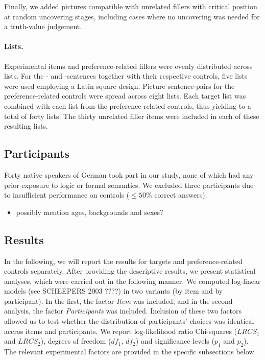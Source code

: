 \documentclass[fleqn,reqno,10pt,draft]{article}
\newcommand{\as}{\acro{as}}
\renewcommand{\es}{\acro{es}}
\begin{document}
Finally, we added pictures compatible with unrelated fillers with
critical position at random uncovering stages, including cases where
no uncovering was needed for a truth-value judgement.

\paragraph{Lists.}
Experimental items and preference-related fillers were evenly
distributed across lists. For the \as- and \es-sentences together with
their respective controls, five lists were used employing a Latin
square design. Picture sentence-pairs for the preference-related
controls were spread across eight lists. Each target list was combined
with each list from the preference-related controls, thus yielding to
a total of forty lists. The thirty unrelated filler items were
included in each of these resulting lists.


\subsection{Participants}
\label{sec:participants} 

Forty native speakers of German took part in our study, none of which had
any prior exposure to logic or formal semantics. We excluded three
participants due to insufficient performance on controls ($\le 50\%$
correct answers).  

\begin{itemize}
\item possibly mention ages, backgrounds and sexes?
\end{itemize}


\subsection{Results}
\label{sec:results}

In the following, we will report the results for targets and
preference-related controls separately. After providing the
descriptive results, we present statistical analyses, which were
carried out in the following manner.  We computed log-linear models
(see SCHEEPERS 2003 ????) in two variants (by item and by participant). In
the first, the factor {\it Item} was included, and in the second
analysis, the factor {\it Participants} was included. Inclusion of
these two factors allowed us to test whether the distribution of
participants' choices was identical accros items and participants. We
report log-likelihood ratio Chi-squares ($LRCS_1$ and $LRCS_2$),
degrees of freedom ($df_1$, $df_2$) and significance levels ($p_1$ and
$p_2$). The relevant experimental factors are provided in the specific
subsections below.
\end{document}
